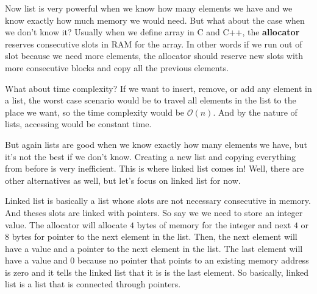\documentclass[../../../main.tex]{subfiles}
\begin{document}
\begin{figure}[H]
\centering
{}
\end{figure}

Now list is very powerful when we know how many elements we have
and we know exactly how much memory we would need. But what about
the case when we don't know it? Usually when we define array in
C and C++, the \textbf{allocator} reserves consecutive slots in
RAM for the array. In other words if we run out of slot because
we need more elements, the allocator should reserve new slots
with more consecutive blocks and copy all the previous elements.

What about time complexity? If we want to insert, remove, or add
any element in a list, the worst case scenario would be to
travel all elements in the list to the place we want, so the
time complexity would be $\mathcal{O}(n)$. And by the nature of
lists, accessing would be constant time.

But again lists are good when we know exactly how many elements
we have, but it's not the best if we don't know. Creating a new
list and copying everything from before is very inefficient. This is
where linked list comes in! Well, there are other alternatives as
well, but let's focus on linked list for now.

Linked list is basically a list whose slots are not necessary
consecutive in memory. And theses slots are linked with pointers.
So say we we need to store an integer value. The allocator will
allocate $4$ bytes of memory for the integer and next $4$ or
$8$ bytes for pointer to the next element in the list. Then,
the next element will have a value and a pointer to the next element
in the list. The last element will have a value and $0$ because
no pointer that points to an existing memory address is zero and it
tells the linked list that it is is the last element. So basically,
linked list is a list that is connected through pointers.
\end{document}
